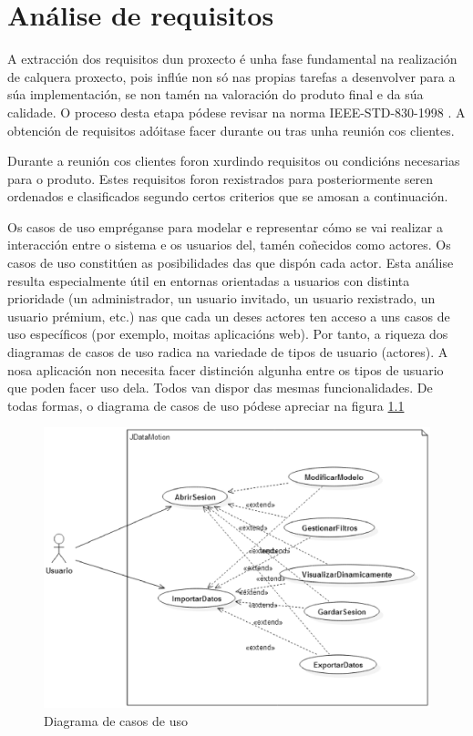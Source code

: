 \chapter{Análise de requisitos}

A extracción dos requisitos dun proxecto é unha fase fundamental na realización de calquera proxecto, pois inflúe non só nas propias tarefas a desenvolver para a súa implementación, se non tamén na valoración do produto final e da súa calidade. O proceso desta etapa pódese revisar na norma IEEE-STD-830-1998 \cite{ieee-std-830-1998}. A obtención de requisitos adóitase facer durante ou tras unha reunión cos clientes.

Durante a reunión cos clientes foron xurdindo requisitos ou condicións necesarias para o produto. Estes requisitos foron rexistrados para posteriormente seren ordenados e clasificados segundo certos criterios que se amosan a continuación.

Os casos de uso empréganse para modelar e representar cómo se vai realizar a interacción entre o sistema e os usuarios del, tamén coñecidos como actores. Os casos de uso constitúen as posibilidades das que dispón cada actor. Esta análise resulta especialmente útil en entornas orientadas a usuarios con distinta prioridade (un administrador, un usuario invitado, un usuario rexistrado, un usuario prémium, etc.) nas que cada un deses actores ten acceso a uns casos de uso específicos (por exemplo, moitas aplicacións web). Por tanto, a riqueza dos diagramas de casos de uso radica na variedade de tipos de usuario (actores). A nosa aplicación non necesita facer distinción algunha entre os tipos de usuario que poden facer uso dela. Todos van dispor das mesmas funcionalidades. De todas formas, o diagrama de casos de uso pódese apreciar na figura \ref{casosUso}

\begin{figure}
\centering
\includegraphics[width=\textwidth,height=\textheight,keepaspectratio]{figuras/casosUso}
\caption{Diagrama de casos de uso}
\label{casosUso}
\end{figure}

